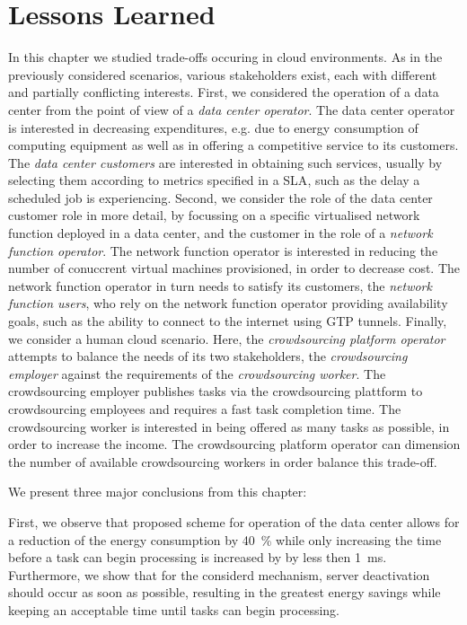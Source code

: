 \section{Lessons Learned}\label{sec:cloud:lessons_learned}
In this chapter we studied trade-offs occuring in cloud environments.
As in the previously considered scenarios, various stakeholders exist, each with different and partially conflicting interests.
First, we considered the operation of a data center from the point of view of a \emph{data center operator}.
The data center operator is interested in decreasing expenditures, e.g. due to energy consumption of computing equipment as well as in offering a competitive service to its customers.
The \emph{data center customers} are interested in obtaining such services, usually by selecting them according to metrics specified in a \gls{SLA}, such as the delay a scheduled job is experiencing.
Second, we consider the role of the data center customer role in more detail, by focussing on a specific virtualised network function deployed in a data center, and the customer in the role of a \emph{network function operator}.
The network function operator is interested in reducing the number of conuccrent virtual machines provisioned, in order to decrease cost.
The network function operator in turn needs to satisfy its customers, the \emph{network function users}, who rely on the network function operator providing availability goals, such as the ability to connect to the internet using \gls{GTP} tunnels.
Finally, we consider a human cloud scenario.
Here, the \emph{crowdsourcing platform operator} attempts to balance the needs of its two stakeholders, the \emph{crowdsourcing employer} against the requirements of the \emph{crowdsourcing worker}.
The crowdsourcing employer publishes tasks via the crowdsourcing plattform to crowdsourcing employees and requires a fast task completion time.
The crowdsourcing worker is interested in being offered as many tasks as possible, in order to increase the income.
The crowdsourcing platform operator can dimension the number of available crowdsourcing workers in order balance this trade-off. 

We present three major conclusions from this chapter:

First, we observe that proposed scheme for operation of the data center allows for a reduction of the energy consumption by \SI{40}{\percent} while only increasing the time before a task can begin processing is increased by by less then \SI{1}{\milli\second}.
Furthermore, we show that for the considerd mechanism, server deactivation should occur as soon as possible, resulting in the greatest energy savings while keeping an acceptable time until tasks can begin processing. 

